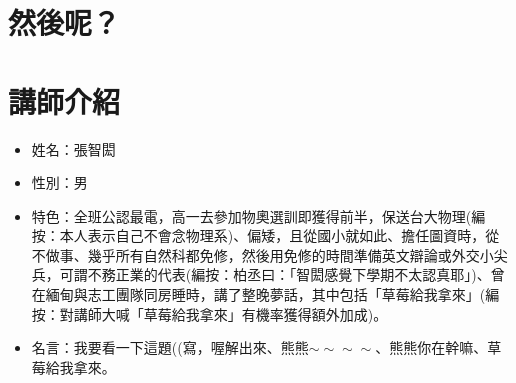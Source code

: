 \section{然後呢？}
\newpage

\newpage
\section{講師介紹}
\begin{itemize}
\item 姓名：張智閎
\item 性別：男
\item 特色：全班公認最電，高一去參加物奧選訓即獲得前半，保送台大物理(編按：本人表示自己不會念物理系)、偏矮，且從國小就如此、擔任圖資時，從不做事、幾乎所有自然科都免修，然後用免修的時間準備英文辯論或外交小尖兵，可謂不務正業的代表(編按：柏丞曰：「智閎感覺下學期不太認真耶」)、曾在緬甸與志工團隊同房睡時，講了整晚夢話，其中包括「草莓給我拿來」(編按：對講師大喊「草莓給我拿來」有機率獲得額外加成)。
\item 名言：我要看一下這題((寫，喔解出來、熊熊$\sim\sim\sim\sim$、熊熊你在幹嘛、草莓給我拿來。
\end{itemize}